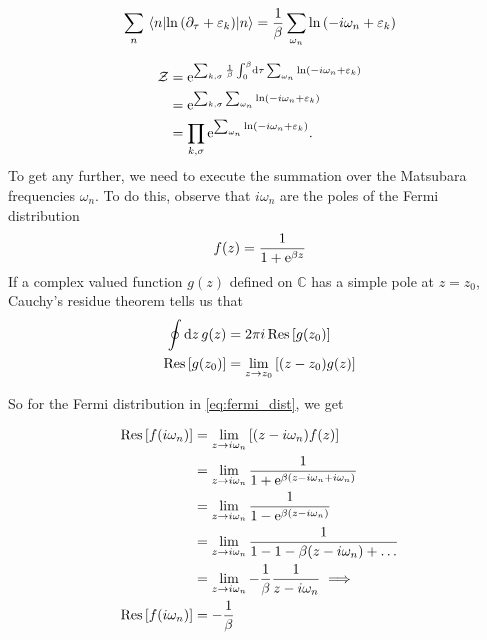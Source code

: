 \begin{equation}
\sum_n\ev{\ln\left(\partial_\tau + \varepsilon_k\right)}{n} = \frac{1}{\beta}\sum_{\omega_n}\ln\left(-i\omega_n + \varepsilon_k\right)
\end{equation}

\begin{align}
\label{eq:_electron}
\begin{split}
\mathcal{Z} &= \mathrm{e}^{\sum_{k,\sigma}\frac{1}{\beta}\int_0^\beta\dd{\tau}\sum_{\omega_n}\ln\left(-i\omega_n + \varepsilon_k\right)} \\
&= \mathrm{e}^{\sum_{k,\sigma}\sum_{\omega_n}\ln\left(-i\omega_n + \varepsilon_k\right)} \\
&= \prod_{k,\sigma}\mathrm{e}^{\sum_{\omega_n}\ln\left(-i\omega_n + \varepsilon_k\right)}.
\end{split}
\end{align}
To get any further, we need to execute the summation over the Matsubara frequencies $\omega_n$. To do this, observe that $i\omega_n$ are the poles of the Fermi distribution
\begin{equation}
\label{eq:fermi_dist}
f(z) = \frac{1}{1+\mathrm{e}^{\beta z}}
\end{equation}
If a complex valued function $g(z)$ defined on $\mathbb{C}$ has a simple pole at $z = z_0$, Cauchy's residue theorem tells us that 
\begin{align}
\oint\dd{z}g(z) &= 2\pi i\Res\left[g(z_0)\right] \\
\Res\left[g(z_0)\right]&= \lim_{z\rightarrow z_0}\left[(z-z_0)g(z)\right]
\end{align}

So for the Fermi distribution in \eqref{eq:fermi_dist}, we get

\begin{align}
\Res\left[f(i\omega_n)\right] &= \lim_{z\rightarrow i\omega_n}\left[(z-i\omega_n)f(z)\right] \nonumber \\
&= \lim_{z\rightarrow i\omega_n}\frac{1}{1+\e^{\beta(z-i\omega_n + i\omega_n)}} \nonumber \\
&= \lim_{z\rightarrow i\omega_n} \frac{1}{1-\e^{\beta(z-i\omega_n)}} \nonumber \\
&=\lim_{z\rightarrow i\omega_n} \frac{1}{1-1-\beta(z-i\omega_n)+\dots} \nonumber \\
&=\lim_{z\rightarrow i\omega_n} -\frac{1}{\beta}\frac{1}{z-i\omega_n} \implies \nonumber \\
\Res\left[f(i\omega_n)\right] &= -\frac{1}{\beta}
\end{align}

